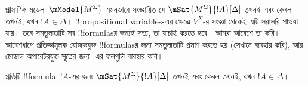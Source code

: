 \documentclass[../../../include/open-logic-section]{subfiles}
\begin{document}


প্রামাণিক মডেল~$\mModel{M^\Sigma}$ এমনভাবে সংজ্ঞায়িত যে $\mSat{M^\Sigma}{!A}[\Delta]$ তখনই এবং কেবল তখনই, যখন $!A \in \Delta$। !!{propositional
variable}s-এর ক্ষেত্রে $V^\Sigma$-র সংজ্ঞা থেকেই এটি সরাসরি পাওয়া যায়। তবে সমতুল্যতাটি সব !!{formula}sর জন্যই সত্য, তা যাচাই করতে হবে। আমরা আবেশে তা করি। আবেশধাপে প্রতিজ্ঞামূলক যোজকযুক্ত !!{formula}sর জন্য সমতুল্যতাটি প্রমাণ করতে হয় (সেখানে  ব্যবহার করি), আর মোডাল অপারেটরযুক্ত সূত্রের জন্য -এর ফলগুলি ব্যবহার করি।

\begin{prop}[সত্যতা-সহায়ক উপপাদ্য]
  প্রতিটি !!{formula}~$!A$-এর জন্য $\mSat{M^\Sigma}{!A}[\Delta]$ তখনই এবং কেবল তখনই, যখন $!A \in \Delta$।
\end{prop}
\end{document}
